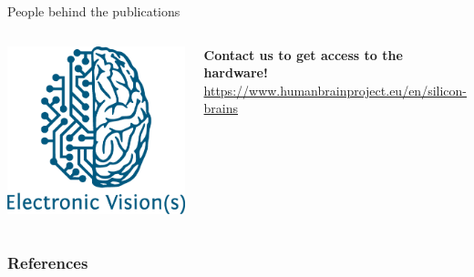\documentclass[10pt,aspectratio=169]{beamer}
\begin{document}
\begin{frame}{People behind the publications}
\begin{columns}
\begin{center}
        \includegraphics[height=\myHeight\textheight]{logos/visions.png}
    \end{center}

    \begin{center}
        \textbf{Contact us to get access to the hardware!} \\
        \vspace{0.5cm}
        \url{https://www.humanbrainproject.eu/en/silicon-brains}
    \end{center}

\end{columns}

\end{frame}




\begin{frame}[allowframebreaks]
        \frametitle{References}
        
        
\end{frame}
\end{document}

